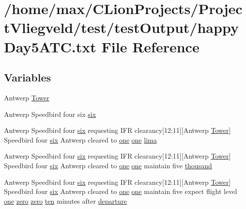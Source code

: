 \hypertarget{happyDay5ATC_8txt}{}\section{/home/max/\+C\+Lion\+Projects/\+Project\+Vliegveld/test/test\+Output/happy\+Day5\+A\+TC.txt File Reference}
\label{happyDay5ATC_8txt}
\subsection*{Variables}
\begin{DoxyCompactItemize}
\item 
Antwerp \hyperlink{happyDay5ATC_8txt_aa713126cf5a2ea490c73c69abd6e8b2e}{Tower}
\item 
Antwerp Speedbird four six \hyperlink{happyDay5ATC_8txt_a57978282a95204080c8ffb626c7d0bd5}{six}
\item 
Antwerp Speedbird four \hyperlink{happyDay5ExpectedATC_8txt_a57978282a95204080c8ffb626c7d0bd5}{six} requesting I\+FR clearancy\mbox{[}12\+:11\mbox{]}\mbox{[}Antwerp \hyperlink{test_2testOutput_2log_8txt_ade5c2a9317c664c53d015e41bdc32393}{Tower}\mbox{]} Speedbird four \hyperlink{happyDay5ExpectedATC_8txt_a57978282a95204080c8ffb626c7d0bd5}{six} Antwerp cleared to \hyperlink{happyDay5ExpectedATC_8txt_a1bdf675837626f29e859d1a241701d26}{one} \hyperlink{happyDay5ExpectedATC_8txt_a1bdf675837626f29e859d1a241701d26}{one} \hyperlink{happyDay5ATC_8txt_abc10fad7597c191bcd8586b1cddb7835}{lima}
\item 
Antwerp Speedbird four \hyperlink{happyDay5ExpectedATC_8txt_a57978282a95204080c8ffb626c7d0bd5}{six} requesting I\+FR clearancy\mbox{[}12\+:11\mbox{]}\mbox{[}Antwerp \hyperlink{test_2testOutput_2log_8txt_ade5c2a9317c664c53d015e41bdc32393}{Tower}\mbox{]} Speedbird four \hyperlink{happyDay5ExpectedATC_8txt_a57978282a95204080c8ffb626c7d0bd5}{six} Antwerp cleared to \hyperlink{happyDay5ExpectedATC_8txt_a1bdf675837626f29e859d1a241701d26}{one} \hyperlink{happyDay5ExpectedATC_8txt_a1bdf675837626f29e859d1a241701d26}{one} maintain five \hyperlink{happyDay5ATC_8txt_a429913a0643fe14faca3dca538caa7bb}{thousand}
\item 
Antwerp Speedbird four \hyperlink{happyDay5ExpectedATC_8txt_a57978282a95204080c8ffb626c7d0bd5}{six} requesting I\+FR clearancy\mbox{[}12\+:11\mbox{]}\mbox{[}Antwerp \hyperlink{test_2testOutput_2log_8txt_ade5c2a9317c664c53d015e41bdc32393}{Tower}\mbox{]} Speedbird four \hyperlink{happyDay5ExpectedATC_8txt_a57978282a95204080c8ffb626c7d0bd5}{six} Antwerp cleared to \hyperlink{happyDay5ExpectedATC_8txt_a1bdf675837626f29e859d1a241701d26}{one} \hyperlink{happyDay5ExpectedATC_8txt_a1bdf675837626f29e859d1a241701d26}{one} maintain five expect flight level \hyperlink{happyDay5ExpectedATC_8txt_a1bdf675837626f29e859d1a241701d26}{one} \hyperlink{happyDay5ExpectedATC_8txt_a1cdb3e947394a8f9b50cff125d86fb29}{zero} \hyperlink{happyDay5ExpectedATC_8txt_a1cdb3e947394a8f9b50cff125d86fb29}{zero} \hyperlink{happyDay5ExpectedATC_8txt_ab9794f8235db42812d8ddd9368cb321e}{ten} minutes after \hyperlink{happyDay5ATC_8txt_af9835824e50bb6ca59bed75129f137e3}{departure}

\end{DoxyCompactItemize}
